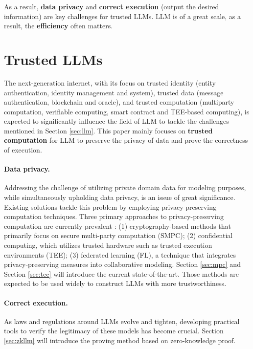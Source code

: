 \documentclass[lang=en]{sjtuarticle}
\begin{document}
As a result, \textbf{data privacy} and \textbf{correct execution} (output the desired information) are key challenges for trusted LLMs. LLM is of a great scale, as a result, the \textbf{efficiency} often matters.

\section{Trusted LLMs}

The next-generation internet, with its focus on trusted identity (entity authentication, identity management and system), trusted data (message authentication, blockchain and oracle), and trusted computation (multiparty computation, verifiable computing, smart contract and TEE-based computing), is expected to significantly influence the field of LLM to tackle the challenges mentioned in Section \ref{sec:llm}. This paper mainly focuses on \textbf{trusted computation} for LLM to preserve the privacy of data and prove the correctness of execution.

\paragraph{Data privacy.}
Addressing the challenge of utilizing private domain data for modeling purposes, while simultaneously upholding
data privacy, is an issue of great significance. Existing solutions tackle this problem by employing privacy-preserving
computation techniques. Three primary approaches to privacy-preserving computation are currently prevalent \cite{chen2023federated}: (1)
cryptography-based methods that primarily focus on secure multi-party computation (SMPC); (2) confidential
computing, which utilizes trusted hardware such as trusted execution environments (TEE); (3) federated learning
(FL), a technique that integrates privacy-preserving measures into collaborative modeling. Section \ref{sec:mpc} and Section \ref{sec:tee} will introduce the current state-of-the-art. Those methods are expected to be used widely to construct LLMs with more trustworthiness.

\paragraph{Correct execution.} As laws and regulations around LLMs evolve
and tighten, developing practical tools to verify the legitimacy of
these models has become crucial. Section \ref{sec:zkllm} will introduce the proving method based on zero-knowledge proof.
\end{document}
